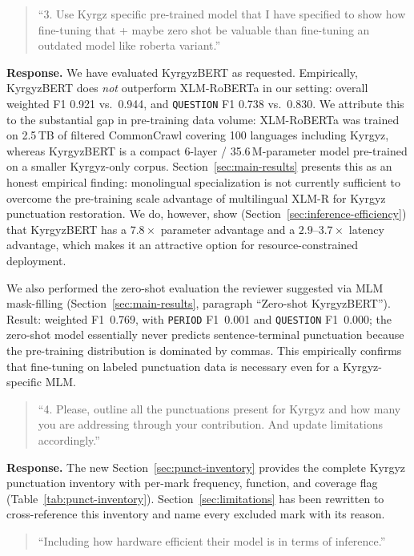 \documentclass[manuscript, review]{acmart}
\begin{document}
\begin{quote}
``3. Use Kyrgz specific pre-trained model that I have specified to show how fine-tuning that + maybe zero shot be valuable than fine-tuning an outdated model like roberta variant.''
\end{quote}

\noindent\textbf{Response.} We have evaluated KyrgyzBERT as requested. Empirically, KyrgyzBERT does \emph{not} outperform XLM-RoBERTa in our setting: overall weighted F1 0.921 vs.\ 0.944, and \texttt{QUESTION} F1 0.738 vs.\ 0.830. We attribute this to the substantial gap in pre-training data volume: XLM-RoBERTa was trained on 2.5\,TB of filtered CommonCrawl covering 100 languages including Kyrgyz, whereas KyrgyzBERT is a compact 6-layer / 35.6\,M-parameter model pre-trained on a smaller Kyrgyz-only corpus. Section~\ref{sec:main-results} presents this as an honest empirical finding: monolingual specialization is not currently sufficient to overcome the pre-training scale advantage of multilingual XLM-R for Kyrgyz punctuation restoration. We do, however, show (Section~\ref{sec:inference-efficiency}) that KyrgyzBERT has a $7.8\times$ parameter advantage and a $2.9$--$3.7\times$ latency advantage, which makes it an attractive option for resource-constrained deployment.

We also performed the zero-shot evaluation the reviewer suggested via MLM mask-filling (Section~\ref{sec:main-results}, paragraph ``Zero-shot KyrgyzBERT''). Result: weighted F1~0.769, with \texttt{PERIOD} F1~0.001 and \texttt{QUESTION} F1~0.000; the zero-shot model essentially never predicts sentence-terminal punctuation because the pre-training distribution is dominated by commas. This empirically confirms that fine-tuning on labeled punctuation data is necessary even for a Kyrgyz-specific MLM.

\begin{quote}
``4. Please, outline all the punctuations present for Kyrgyz and how many you are addressing through your contribution. And update limitations accordingly.''
\end{quote}

\noindent\textbf{Response.} The new Section~\ref{sec:punct-inventory} provides the complete Kyrgyz punctuation inventory with per-mark frequency, function, and coverage flag (Table~\ref{tab:punct-inventory}). Section~\ref{sec:limitations} has been rewritten to cross-reference this inventory and name every excluded mark with its reason.

\begin{quote}
``Including how hardware efficient their model is in terms of inference.''
\end{quote}
\end{document}
